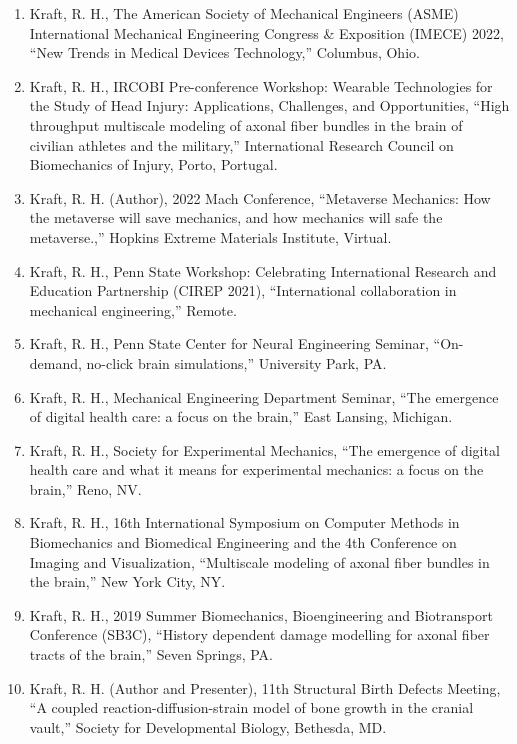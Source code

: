 \documentclass[11pt]{article}
\begin{document}
\begin{enumerate}
\def\labelenumi{\arabic{enumi}.}
\item
  Kraft, R. 
H., The American Society of Mechanical Engineers (ASME)
  International Mechanical Engineering Congress \& Exposition (IMECE)
  2022, ``New Trends in Medical Devices Technology,'' Columbus, Ohio.
\item
  Kraft, R. 
H., IRCOBI Pre-conference Workshop: Wearable Technologies
  for the Study of Head Injury: Applications, Challenges, and
  Opportunities, ``High throughput multiscale modeling of axonal fiber
  bundles in the brain of civilian athletes and the military,''
  International Research Council on Biomechanics of Injury, Porto,
  Portugal.
\item
  Kraft, R. 
H. 
(Author), 2022 Mach Conference, ``Metaverse Mechanics: How
  the metaverse will save mechanics, and how mechanics will safe the
  metaverse.,'' Hopkins Extreme Materials Institute, Virtual.
\item
  Kraft, R. 
H., Penn State Workshop: Celebrating International Research
  and Education Partnership (CIREP 2021), ``International collaboration
  in mechanical engineering,'' Remote.
\item
  Kraft, R. 
H., Penn State Center for Neural Engineering Seminar,
  ``On-demand, no-click brain simulations,'' University Park, PA.
\item
  Kraft, R. 
H., Mechanical Engineering Department Seminar, ``The
  emergence of digital health care: a focus on the brain,'' East Lansing,
  Michigan.
\item
  Kraft, R. 
H., Society for Experimental Mechanics, ``The emergence of
  digital health care and what it means for experimental mechanics: a
  focus on the brain,'' Reno, NV.
\item
  Kraft, R. 
H., 16th International Symposium on Computer Methods in
  Biomechanics and Biomedical Engineering and the 4th Conference on
  Imaging and Visualization, ``Multiscale modeling of axonal fiber
  bundles in the brain,'' New York City, NY.
\item
  Kraft, R. 
H., 2019 Summer Biomechanics, Bioengineering and
  Biotransport Conference (SB3C), ``History dependent damage modelling
  for axonal fiber tracts of the brain,'' Seven Springs, PA.
\item
  Kraft, R. 
H. 
(Author and Presenter), 11th Structural Birth Defects
  Meeting, ``A coupled reaction-diffusion-strain model of bone growth in
  the cranial vault,'' Society for Developmental Biology, Bethesda, MD.

\end{enumerate}
\end{document}
